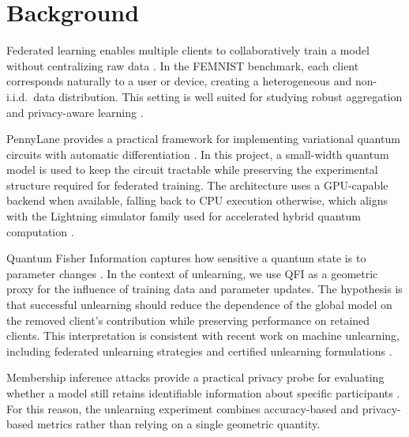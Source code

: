 \section{Background}
\label{sec:background}

Federated learning enables multiple clients to collaboratively train a model without centralizing raw data \cite{fedavg,kairouz2019}. In the FEMNIST benchmark, each client corresponds naturally to a user or device, creating a heterogeneous and non-i.i.d.\ data distribution. This setting is well suited for studying robust aggregation and privacy-aware learning \cite{leaf}.

PennyLane provides a practical framework for implementing variational quantum circuits with automatic differentiation \cite{pennylane}. In this project, a small-width quantum model is used to keep the circuit tractable while preserving the experimental structure required for federated training. The architecture uses a GPU-capable backend when available, falling back to CPU execution otherwise, which aligns with the Lightning simulator family used for accelerated hybrid quantum computation \cite{lightning2024}.

Quantum Fisher Information captures how sensitive a quantum state is to parameter changes \cite{qfi}. In the context of unlearning, we use QFI as a geometric proxy for the influence of training data and parameter updates. The hypothesis is that successful unlearning should reduce the dependence of the global model on the removed client's contribution while preserving performance on retained clients. This interpretation is consistent with recent work on machine unlearning, including federated unlearning strategies and certified unlearning formulations \cite{unlearning_survey_2024,federated_unlearning_active_forgetting,forgettable_federated_linear_learning}.

Membership inference attacks provide a practical privacy probe for evaluating whether a model still retains identifiable information about specific participants \cite{mia}. For this reason, the unlearning experiment combines accuracy-based and privacy-based metrics rather than relying on a single geometric quantity.
